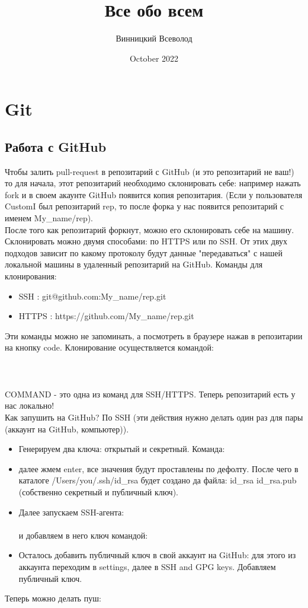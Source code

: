 \documentclass{article}
\title{Все обо всем}
\author{Винницкий Всеволод}
\date{October 2022}
\begin{document}
\maketitle

\section{Git}
\subsection{Работа с GitHub}
Чтобы залить pull-request в репозитарий с GitHub (и это репозитарий не ваш!) то для начала, этот репозитарий необходимо склонировать себе: например нажать fork и в своем акаунте GitHub появится копия репозитария. (Если у пользователя CustomI был репозитарий rep, то после форка у нас появится репозитарий с именем My\_name/rep). \\
После того как репозитарий форкнут, можно его склонировать себе на машину. Склонировать можно двумя способами: по HTTPS или по SSH. От этих двух подходов зависит по какому протоколу будут данные "передаваться" с нашей локальной машины в удаленный репозитарий на GitHub.
Команды для клонирования:
\begin{itemize}
\item SSH : git@github.com:My\_name/rep.git
\item HTTPS : https://github.com/My\_name/rep.git
\end{itemize}

Эти команды можно не запоминать, а посмотреть в браузере нажав в репозитарии на кнопку code. Клонирование осуществляется командой:
\\
\\
\\
\\
COMMAND - это одна из команд для SSH/HTTPS. Теперь репозитарий есть у нас локально!
\\
Как запушить на GitHub?
По SSH (эти действия нужно делать один раз для пары (аккаунт на GitHub, компьютер)). 

\begin{itemize}
\item Генерируем два ключа: открытый и секретный. Команда:
\\
\item далее жмем enter, все значения будут проставлены по дефолту. После чего в каталоге /Users/you/.ssh/id\_rsa будет создано да файла: id\_rsa id\_rsa.pub (собственно секретный и публичный ключ).

\item Далее запускаем SSH-агента:
\\
\\
и добавляем в него ключ командой:
\\
\item Осталось добавить публичный ключ в свой аккаунт на GitHub: для этого из аккаунта переходим в settings, далее в SSH and GPG keys. Добавляем публичный ключ.
\end{itemize}

Теперь можно делать пуш: 
\end{document}
